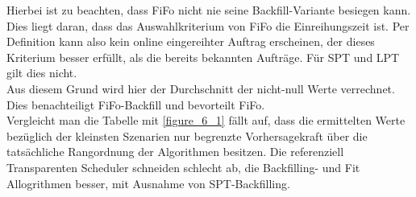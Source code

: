\begin{table}[]
	\caption{Durchsnittliche Größe jeder Zeile und Spalte; links das Verhältnis aus durchschn. Gewinn und Verlierer Größe}
	\label{tabRelFit}
\end{table}

Hierbei ist zu beachten, dass FiFo nicht nie seine Backfill-Variante besiegen kann. Dies liegt daran, dass das Auswahlkriterium von FiFo die Einreihungszeit ist. Per Definition kann also kein online eingereihter Auftrag erscheinen, der dieses Kriterium besser erfüllt, als die bereits bekannten Aufträge. Für SPT und LPT gilt dies nicht.\\
Aus diesem Grund wird hier der Durchschnitt der nicht-null Werte verrechnet. Dies benachteiligt FiFo-Backfill und bevorteilt FiFo.\\
Vergleicht man die Tabelle mit \ref{figure_6_1} fällt auf, dass die ermittelten Werte bezüglich der kleinsten Szenarien nur begrenzte Vorhersagekraft über die tatsächliche Rangordnung der Algorithmen besitzen. Die referenziell Transparenten Scheduler schneiden schlecht ab, die Backfilling- und Fit Allogrithmen besser, mit Ausnahme von SPT-Backfilling.\\

